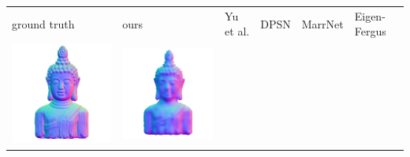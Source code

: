 \begin{tabularx}{\linewidth}{@{}Y@{}Y@{}Y@{}Y@{}Y@{}Y@{}}
ground truth & ours & Yu et al. & DPSN & MarrNet & Eigen-Fergus \\
\includegraphics[width=\linewidth]{semisynthetic/20150514_16_gt.png} &
\includegraphics[width=\linewidth]{semisynthetic/20150514_16_ours_out.png} &

\end{tabularx}
